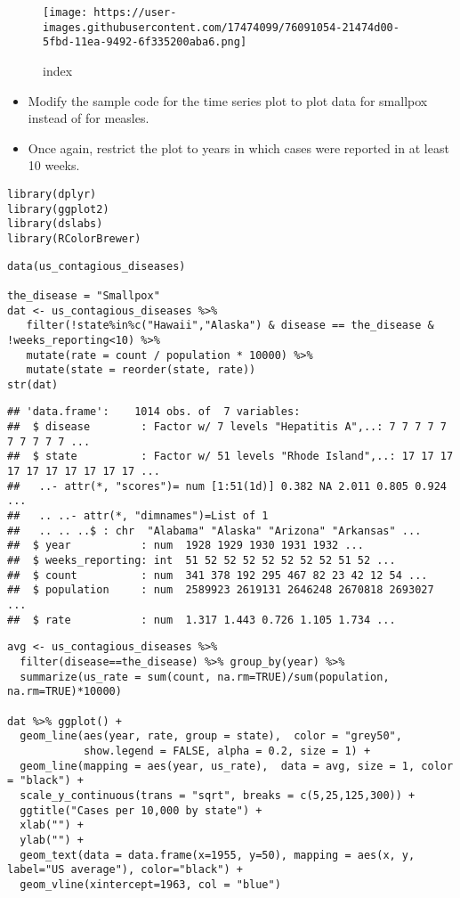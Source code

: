 \documentclass[]{article}
\providecommand{\tightlist}{%
  \setlength{\itemsep}{0pt}\setlength{\parskip}{0pt}}
\begin{document}
\begin{figure}
\centering
\texttt{[image: https://user-images.githubusercontent.com/17474099/76091054-21474d00-5fbd-11ea-9492-6f335200aba6.png]}
\caption{index}
\end{figure}

\begin{itemize}
\tightlist
\item
  Modify the sample code for the time series plot to plot data for
  smallpox instead of for measles.
\item
  Once again, restrict the plot to years in which cases were reported in
  at least 10 weeks.
\end{itemize}

\begin{verbatim}
library(dplyr)
library(ggplot2)
library(dslabs)
library(RColorBrewer)
\end{verbatim}

\begin{verbatim}
data(us_contagious_diseases)

the_disease = "Smallpox"
dat <- us_contagious_diseases %>%
   filter(!state%in%c("Hawaii","Alaska") & disease == the_disease & !weeks_reporting<10) %>%
   mutate(rate = count / population * 10000) %>%
   mutate(state = reorder(state, rate))
str(dat)
\end{verbatim}

\begin{verbatim}
## 'data.frame':    1014 obs. of  7 variables:
##  $ disease        : Factor w/ 7 levels "Hepatitis A",..: 7 7 7 7 7 7 7 7 7 7 ...
##  $ state          : Factor w/ 51 levels "Rhode Island",..: 17 17 17 17 17 17 17 17 17 17 ...
##   ..- attr(*, "scores")= num [1:51(1d)] 0.382 NA 2.011 0.805 0.924 ...
##   .. ..- attr(*, "dimnames")=List of 1
##   .. .. ..$ : chr  "Alabama" "Alaska" "Arizona" "Arkansas" ...
##  $ year           : num  1928 1929 1930 1931 1932 ...
##  $ weeks_reporting: int  51 52 52 52 52 52 52 52 51 52 ...
##  $ count          : num  341 378 192 295 467 82 23 42 12 54 ...
##  $ population     : num  2589923 2619131 2646248 2670818 2693027 ...
##  $ rate           : num  1.317 1.443 0.726 1.105 1.734 ...
\end{verbatim}

\begin{verbatim}
avg <- us_contagious_diseases %>%
  filter(disease==the_disease) %>% group_by(year) %>%
  summarize(us_rate = sum(count, na.rm=TRUE)/sum(population, na.rm=TRUE)*10000)

dat %>% ggplot() +
  geom_line(aes(year, rate, group = state),  color = "grey50", 
            show.legend = FALSE, alpha = 0.2, size = 1) +
  geom_line(mapping = aes(year, us_rate),  data = avg, size = 1, color = "black") +
  scale_y_continuous(trans = "sqrt", breaks = c(5,25,125,300)) + 
  ggtitle("Cases per 10,000 by state") + 
  xlab("") + 
  ylab("") +
  geom_text(data = data.frame(x=1955, y=50), mapping = aes(x, y, label="US average"), color="black") + 
  geom_vline(xintercept=1963, col = "blue")
\end{verbatim}
\end{document}
